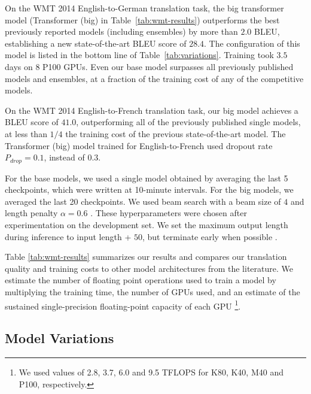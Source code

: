 \documentclass{article}
\begin{document}
On the WMT 2014 English-to-German translation task, the big transformer model (Transformer (big) in Table~\ref{tab:wmt-results}) outperforms the best previously reported models (including ensembles) by more than $2.0$ BLEU, establishing a new state-of-the-art BLEU score of $28.4$.  The configuration of this model is listed in the bottom line of Table~\ref{tab:variations}.  Training took $3.5$ days on $8$ P100 GPUs.  Even our base model surpasses all previously published models and ensembles, at a fraction of the training cost of any of the competitive models.

On the WMT 2014 English-to-French translation task, our big model achieves a BLEU score of $41.0$, outperforming all of the previously published single models, at less than $1/4$ the training cost of the previous state-of-the-art model. The Transformer (big) model trained for English-to-French used dropout rate $P_{drop}=0.1$, instead of $0.3$.

For the base models, we used a single model obtained by averaging the last 5 checkpoints, which were written at 10-minute intervals.  For the big models, we averaged the last 20 checkpoints. We used beam search with a beam size of $4$ and length penalty $\alpha=0.6$ \citep{wu2016google}.  These hyperparameters were chosen after experimentation on the development set.  We set the maximum output length during inference to input length + $50$, but terminate early when possible \citep{wu2016google}.

Table \ref{tab:wmt-results} summarizes our results and compares our translation quality and training costs to other model architectures from the literature.  We estimate the number of floating point operations used to train a model by multiplying the training time, the number of GPUs used, and an estimate of the sustained single-precision floating-point capacity of each GPU \footnote{We used values of 2.8, 3.7, 6.0 and 9.5 TFLOPS for K80, K40, M40 and P100, respectively.}.

\subsection{Model Variations}
\end{document}
